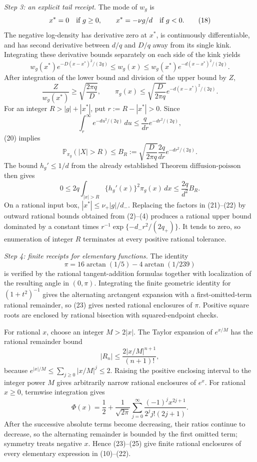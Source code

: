 \emph{Step 3: an explicit tail receipt.}
The mode of \(w_g\) is
\[
 x^*=0\quad\hbox{if }g\geq0,
 \qquad x^*=-\nu g/d\quad\hbox{if }g<0.
\tag{18}
\]
The negative log-density has derivative zero at \(x^*\), is continuously differentiable, and has second derivative between \(d/q\) and \(D/q\) away from its single kink.  Integrating these derivative bounds separately on each side of the kink yields
\[
 w_g(x^*)e^{-D(x-x^*)^2/(2q)}
 \leq w_g(x)
 \leq w_g(x^*)e^{-d(x-x^*)^2/(2q)}.
\tag{19}
\]
After integration of the lower bound and division of the upper bound by \(Z\),
\[
 \frac Z{w_g(x^*)}\geq\sqrt{\frac{2\pi q}{D}},
 \qquad
 \pi_g(x)\leq\sqrt{\frac D{2\pi q}}
 e^{-d(x-x^*)^2/(2q)}.
\tag{20}
\]
For an integer \(R>|g|+|x^*|\), put \(r:=R-|x^*|>0\).  Since
\[
 \int_r^\infty e^{-du^2/(2q)}\,du
 \leq\frac q{dr}e^{-dr^2/(2q)},
\]
(20) implies
\[
 \mathbb P_{\pi_g}(|X|>R)
 \leq B_R:=\sqrt{\frac D{2\pi q}}\frac{2q}{dr}
 e^{-dr^2/(2q)}.
\tag{21}
\]
The bound \(h_g'\leq1/d\) from the already established Theorem \(\mathrm{diffusion\mbox{-}poisson}\) then gives
\[
 0\leq2q\int_{|x|>R}\{h_g'(x)\}^2\pi_g(x)\,dx
 \leq\frac{2q}{d^2}B_R.
\tag{22}
\]
On a rational input box, \(|x^*|\leq\nu_+|g|/d_-\).  Replacing the factors in (21)--(22) by outward rational bounds obtained from (2)--(4) produces a rational upper bound dominated by a constant times \(r^{-1}\exp\{-d_-r^2/(2q_+)\}\).  It tends to zero, so enumeration of integer \(R\) terminates at every positive rational tolerance.

\emph{Step 4: finite receipts for elementary functions.}
The identity
\[
 \pi=16\arctan(1/5)-4\arctan(1/239)
\tag{23}
\]
is verified by the rational tangent-addition formulas together with localization of the resulting angle in \((0,\pi)\).  Integrating the finite geometric identity for \((1+t^2)^{-1}\) gives the alternating arctangent expansion with a first-omitted-term rational remainder, so (23) gives nested rational enclosures of \(\pi\).  Positive square roots are enclosed by rational bisection with squared-endpoint checks.

For rational \(x\), choose an integer \(M>2|x|\).  The Taylor expansion of \(e^{x/M}\) has the rational remainder bound
\[
 |R_n|\leq\frac{2|x/M|^{n+1}}{(n+1)!},
\tag{24}
\]
because \(e^{|x|/M}\leq\sum_{j\geq0}|x/M|^j\leq2\).  Raising the positive enclosing interval to the integer power \(M\) gives arbitrarily narrow rational enclosures of \(e^x\).  For rational \(x\geq0\), termwise integration gives
\[
 \Phi(x)=\frac12+\frac1{\sqrt{2\pi}}
 \sum_{j=0}^\infty\frac{(-1)^jx^{2j+1}}{2^j j!(2j+1)}.
\tag{25}
\]
After the successive absolute terms become decreasing, their ratios continue to decrease, so the alternating remainder is bounded by the first omitted term; symmetry treats negative \(x\).  Hence (23)--(25) give finite rational enclosures of every elementary expression in (10)--(22).

